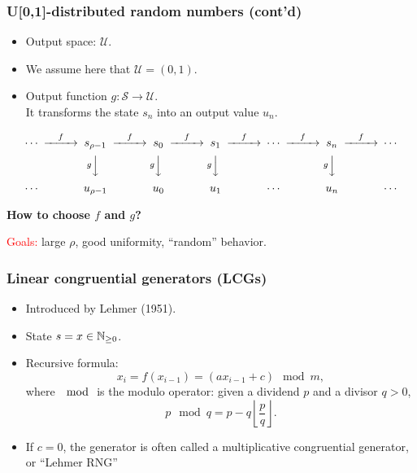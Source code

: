 \documentclass[aspectratio=169]{beamer}
\def\red{\color{red}}
\begin{document}
	\begin{frame}
		\frametitle{U[0,1]-distributed random numbers (cont'd)}
		
		\begin{itemize}
			\item
			Output space: $\mathcal{U}$.
			\item
			We assume here that $\mathcal{U} = (0,1)$.
			\item
			Output function $g: \mathcal{S} \rightarrow \mathcal{U}$.\\
			It transforms the state $s_n$ into an output value $u_n$.
		\end{itemize}
		
		\begin{small}
			\[
			\begin{CD}
				\cdots @>f>> s_{\rho-1} @>f>> s_0 @>f>> s_1  @>f>> 
				\cdots @>f>> s_n @>f>> \cdots \\ 
				@. @V{g}VV  @V{g}VV   @V{g}VV   
				@.  @V{g}VV  \\
				\cdots @. u_{\rho-1} @. u_0
				@.  u_1  @.   \cdots @.  u_n @.  \cdots \\
			\end{CD}
			\]
			\label{fig:rng}
		\end{small}
		
		\mbox{}
		
		{\bf How to choose $f$ and $g$?}
		
		\mbox{}
		
		\textcolor{red}{Goals:} large $\rho$, good uniformity, ``random'' behavior.
		
	\end{frame}
	
	\begin{frame}
		\frametitle{Linear congruential generators (LCGs)}
		
\begin{itemize}
\item
Introduced by Lehmer (1951).
\item
State $s = x \in {\mathbb{N}}_{\geq 0}$.
\item
Recursive formula:
$$
x_i = f(x_{i-1}) = (ax_{i-1}+c) \mod m,
$$
where $\mod$ is the modulo operator: given a dividend $p$ and a divisor
$q > 0$,
$$
p \mod q = p - q\left\lfloor \frac{p}{q} \right\rfloor.
$$
\item
If $c = 0$, the generator is often called a multiplicative congruential generator, or ``{\red Lehmer RNG}''
\end{itemize}
		
\end{frame}
	
\end{document}
